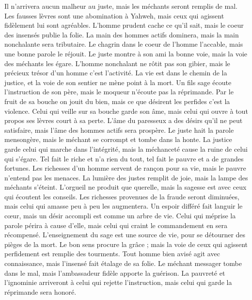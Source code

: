 \begin{multicols}{2}
Il n’arrivera aucun malheur au juste, mais les méchants seront remplis de mal.
Les fausses lèvres sont une abomination à Yahweh, mais ceux qui agissent fidèlement lui sont agréables.
L'homme prudent cache ce qu’il sait, mais le coeur des insensés publie la folie.
La main des hommes actifs dominera, mais la main nonchalante sera tributaire.
Le chagrin dans le coeur de l'homme l'accable, mais une bonne parole le réjouit.
Le juste montre à son ami la bonne voie, mais la voie des méchants les égare.
L’homme nonchalant ne rôtit pas son gibier, mais le précieux trésor d'un homme c’est l’activité.
La vie est dans le chemin de la justice, et la voie de son sentier ne mène point à la mort.
\VerseOne{}Un fils sage écoute l'instruction de son père, mais le moqueur n'écoute pas la réprimande.
Par le fruit de sa bouche on jouit du bien, mais ce que désirent les perfides c’est la violence.
Celui qui veille sur sa bouche garde son âme, mais celui qui ouvre à tout propos ses lèvres court à sa perte.
L'âme du paresseux a des désirs qu’il ne peut satisfaire, mais l'âme des hommes actifs sera prospère.
Le juste hait la parole mensongère, mais le méchant se corrompt et tombe dans la honte.
La justice garde celui qui marche dans l’intégrité, mais la méchanceté cause la ruine de celui qui s'égare.
Tel fait le riche et n'a rien du tout, tel fait le pauvre et a de grandes fortunes.
Les richesses d'un homme servent de rançon pour sa vie, mais le pauvre n’entend pas les menaces.
La lumière des justes remplit de joie, mais la lampe des méchants s’éteint.
L'orgueil ne produit que querelle, mais la sagesse est avec ceux qui écoutent les conseils.
Les richesses provenues de la fraude seront diminuées, mais celui qui amasse peu à peu les augmentera.
Un espoir différé fait languir le cœur, mais un désir accompli est comme un arbre de vie.
Celui qui méprise la parole périra à cause d'elle, mais celui qui craint le commandement en sera récompensé.
L'enseignement du sage est une source de vie, pour se détourner des pièges de la mort.
Le bon sens procure la grâce ; mais la voie de ceux qui agissent perfidement est remplie des tourments.
Tout homme bien avisé agit avec connaissance, mais l’insensé fait étalage de sa folie.
Le méchant messager tombe dans le mal, mais l'ambassadeur fidèle apporte la guérison.
La pauvreté et l'ignominie arriveront à celui qui rejette l'instruction, mais celui qui garde la réprimande sera honoré.

\end{multicols}
